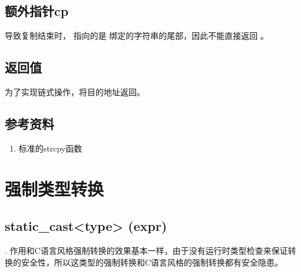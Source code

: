 \documentclass[letterpaper,10pt,english]{sphinxmanual}
\begin{document}
\subsection{额外指针cp}
\label{\detokenize{cpp/09_strcpy:cp}}
 导致复制结束时，  指向的是  绑定的字符串的尾部，因此不能直接返回  。


\subsection{返回值}
\label{\detokenize{cpp/09_strcpy:id1}}
为了实现链式操作，将目的地址返回。

%
\begin{sphinxVerbatim}[commandchars=\\\{\}]
     
\end{sphinxVerbatim}


\subsection{参考资料}
\label{\detokenize{cpp/09_strcpy:id2}}\begin{enumerate}
\item {} 
标准的strcpy函数

\end{enumerate}
\begin{quote}

\end{quote}


\section{强制类型转换}
\label{\detokenize{cpp/10_cast::doc}}\label{\detokenize{cpp/10_cast:id1}}

\subsection{static\_cast\textless{}type\textgreater{} (expr)}
\label{\detokenize{cpp/10_cast:static-cast-type-expr}}
.  作用和C语言风格强制转换的效果基本一样，由于没有运行时类型检查来保证转换的安全性，所以这类型的强制转换和C语言风格的强制转换都有安全隐患。
\end{document}
